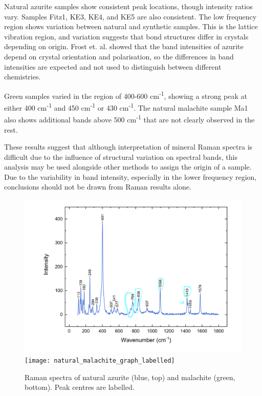 Natural azurite samples show consistent peak locations, though intensity ratios vary. Samples Fitz1, KE3, KE4, and KE5 are also consistent. The low frequency region shows variation between natural and synthetic samples. This is the lattice vibration region, and variation suggests that bond structures differ in crystals depending on origin. Frost et. al. showed that the band intensities of azurite depend on crystal orientation and polarisation, so the differences in band intensities are expected and not used to distinguish between different chemistries.~\autocite{Frost}

Green samples varied in the region of 400-600 cm\textsuperscript{-1}, showing a strong peak at either 400 cm\textsuperscript{-1} and 450 cm\textsuperscript{-1} or 430 cm\textsuperscript{-1}. The natural malachite sample Ma1 also shows additional bands above 500 cm\textsuperscript{-1} that are not clearly observed in the rest. 

These results suggest that although interpretation of mineral Raman spectra is difficult due to the influence of structural variation on spectral bands, this analysis may be used alongside other methods to assign the origin of a sample. Due to the variability in band intensity, especially in the lower frequency region, conclusions should not be drawn from Raman results alone.

\begin{figure}[H]
\centering
\begin{minipage}[t]{\linewidth}
  \centering
  \includegraphics[width=0.9\linewidth]{az1_blue_withlabels}
\hfill
\texttt{[image: natural\_malachite\_graph\_labelled]}
\hfill
\end{minipage}
\caption[Raman spectra of natural azurite and malachite, peak centres labelled.]{Raman spectra of natural azurite (blue, top) and malachite (green, bottom). Peak centres are labelled.}
\label{fig:label_raman}
\end{figure}

